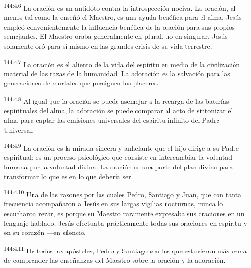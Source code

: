 \par 
\textsuperscript{144:4.6} La oración es un antídoto contra la introspección nociva. La oración, al menos tal como la enseñó el Maestro, es una ayuda benéfica para el alma. Jesús empleó convenientemente la influencia benéfica de la oración para sus propios semejantes. El Maestro oraba generalmente en plural, no en singular. Jesús solamente oró para sí mismo en las grandes crisis de su vida terrestre.

\par 
\textsuperscript{144:4.7} La oración es el aliento de la vida del espíritu en medio de la civilización material de las razas de la humanidad. La adoración es la salvación para las generaciones de mortales que persiguen los placeres.

\par 
\textsuperscript{144:4.8} Al igual que la oración se puede asemejar a la recarga de las baterías espirituales del alma, la adoración se puede comparar al acto de sintonizar el alma para captar las emisiones universales del espíritu infinito del Padre Universal.

\par 
\textsuperscript{144:4.9} La oración es la mirada sincera y anhelante que el hijo dirige a su Padre espiritual; es un proceso psicológico que consiste en intercambiar la voluntad humana por la voluntad divina. La oración es una parte del plan divino para transformar lo que es en lo que debería ser.

\par 
\textsuperscript{144:4.10} Una de las razones por las cuales Pedro, Santiago y Juan, que con tanta frecuencia acompañaron a Jesús en sus largas vigilias nocturnas, nunca lo escucharon rezar, es porque su Maestro raramente expresaba sus oraciones en un lenguaje hablado. Jesús efectuaba prácticamente todas sus oraciones en espíritu y en su corazón ---en silencio.

\par 
\textsuperscript{144:4.11} De todos los apóstoles, Pedro y Santiago son los que estuvieron más cerca de comprender las enseñanzas del Maestro sobre la oración y la adoración.

